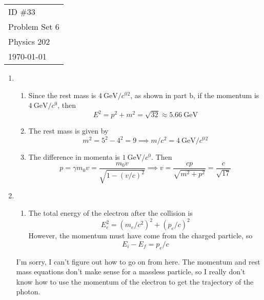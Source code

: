 \documentclass[fleqn]{article}[12pt]
\begin{document}
    \begin{tabular}{l}
        ID \#33 \\
        Problem Set 6 \\
        Physics 202 \\
        \today
    \end{tabular}

\begin{enumerate}
    \item
    \begin{enumerate}
        \item Since the rest mass is $\SI{4}{\giga\electronvolt/\clight^2}$, as shown in part b, if the momentum is $\SI{4}{\giga\electronvolt/\clight}$, then
        \begin{equation*}
            E^2 = p^2 + m^2 = \sqrt{32} \approx \SI{5.66}{\giga\electronvolt}
        \end{equation*}

        \item The rest mass is given by
        \begin{equation*}
            m^2 = 5^2 - 4^2 = 9 \implies m/c^2 = \SI{4}{\giga\electronvolt/\clight^2}
        \end{equation*}

        \item The difference in momenta is $\SI{1}{\giga\electronvolt/\clight}$. Then
        \begin{equation*}
            p = \gamma m_0 v = \frac{m_0v}{\sqrt{1-(v/c)^2}} \implies v = \frac{c p}{\sqrt{m^2 + p^2}} = \frac{c}{\sqrt{17}}
        \end{equation*}
    \end{enumerate}

    \item \begin{enumerate}
        \item The total energy of the electron after the collision is
        \begin{equation*}
            E_e^2 = (m_e/c^2)^2 + (p_e/c)^2
        \end{equation*}
        However, the momentum must have come from the charged particle, so
        \begin{equation*}
            E_i-E_f = p_e/c
        \end{equation*}
    \end{enumerate}
    I'm sorry, I can't figure out how to go on from here. The momentum and rest mass equations don't make sense for a massless particle, so I really don't know how to use the momentum of the electron to get the trajectory of the photon.


\end{enumerate}
\end{document}
